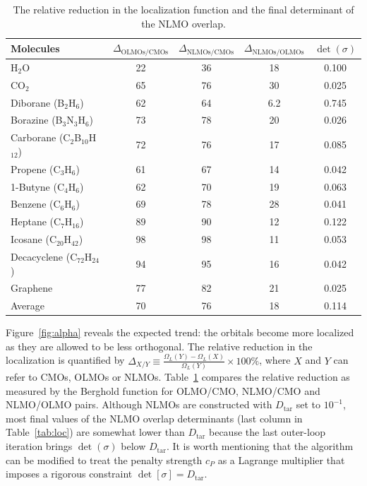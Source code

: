 \documentclass[aps,prl,reprint,amsmath,amssymb]{revtex4-1}
\begin{document}
\begin{table}[htbp]
\caption{The relative reduction in the localization function and the final determinant of the NLMO overlap.}
\label{tab:loc}
\centering
\begin{tabular}{l c c c c}
\hline\hline
Molecules & $\Delta_{\text{OLMOs/CMOs}}$  & $\Delta_{\text{NLMOs/CMOs}}$ & $\Delta_{\text{NLMOs/OLMOs}}$ & $\det(\sigma)$ \\
\hline
H$_2$O & 22 & 36 & 18 & 0.100 \\ 
CO$_2$ & 65 & 76 & 30 & 0.025 \\
Diborane (B$_2$H$_6$) & 62 & 64 & 6.2 & 0.745 \\
Borazine (B$_3$N$_3$H$_6$) & 73 & 78 & 20 & 0.026 \\
Carborane (C$_2$B$_{10}$H$_{12}$) & 72 & 76 & 17 & 0.085 \\ 
Propene (C$_3$H$_6$) & 61 & 67 & 14 & 0.042 \\
1-Butyne (C$_4$H$_6$) & 62 & 70 & 19 & 0.063 \\
Benzene (C$_6$H$_6$) & 69 & 78 & 28 & 0.041 \\ 
Heptane (C$_7$H$_{16}$) & 89 & 90 & 12 & 0.122 \\ 
Icosane (C$_{20}$H$_{42}$) & 98 & 98 & 11 & 0.053 \\ 
Decacyclene (C$_{72}$H$_{24}$) & 94 & 95 & 16 & 0.042 \\ 
Graphene & 77 & 82 & 21 & 0.025 \\
\hline
Average & 70 & 76 & 18 & 0.114 \\
\hline
\hline
\end{tabular}
\label{table:nonlin}
\end{table}

Figure~\ref{fig:alpha} reveals the expected trend: the orbitals become more localized as they are allowed to be less orthogonal. 
The relative reduction in the localization is quantified by $\Delta_{X/Y} \equiv \frac{\Omega_L(Y)-\Omega_L(X)}{\Omega_L(Y)} \times 100 \%$, where $X$ and $Y$ can refer to CMOs, OLMOs or NLMOs.
Table~\ref{table:nonlin} compares the relative reduction as measured by the Berghold function for OLMO/CMO, NLMO/CMO and NLMO/OLMO pairs. Although NLMOs are constructed with $D_{\text{tar}}$ set to $10^{-1}$, most final values of the NLMO overlap determinants (last column in Table~\ref{tab:loc}) are somewhat lower than $D_{\text{tar}}$ because the last outer-loop iteration brings $\det(\sigma)$ below $D_{\text{tar}}$. It is worth mentioning that the algorithm can be modified to treat the penalty strength $c_P$ as a Lagrange multiplier that imposes a rigorous constraint $\det\left[\sigma\right]=D_{\text{tar}}$. 
\end{document}
